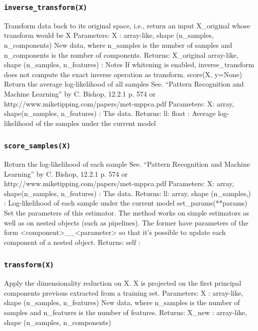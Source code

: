 \begin{frame}[fragile]
\subsubsection*{\texttt{inverse_transform(X)}}
Transform data back to its original space, i.e., return an input X_original whose transform would be X
Parameters:	
X : array-like, shape (n_samples, n_components)
New data, where n_samples is the number of samples and n_components is the number of components.
Returns:	
X_original array-like, shape (n_samples, n_features) :
Notes
If whitening is enabled, inverse_transform does not compute the exact inverse operation as transform.
score(X, y=None)
Return the average log-likelihood of all samples
See. “Pattern Recognition and Machine Learning” by C. Bishop, 12.2.1 p. 574 or http://www.miketipping.com/papers/met-mppca.pdf
Parameters:	
X: array, shape(n_samples, n_features) :
The data.
Returns:	
ll: float :
Average log-likelihood of the samples under the current model
\subsubsection*{\texttt{score_samples(X)}}
Return the log-likelihood of each sample
See. “Pattern Recognition and Machine Learning” by C. Bishop, 12.2.1 p. 574 or http://www.miketipping.com/papers/met-mppca.pdf
Parameters:	
X: array, shape(n_samples, n_features) :
The data.
Returns:	
ll: array, shape (n_samples,) :
Log-likelihood of each sample under the current model
set_params(**params)
Set the parameters of this estimator.
The method works on simple estimators as well as on nested objects (such as pipelines). The former have parameters of the form <component>__<parameter> so that it’s possible to update each component of a nested object.
Returns:	self :
\subsubsection*{\texttt{transform(X)}}
Apply the dimensionality reduction on X.
X is projected on the first principal components previous extracted from a training set.
Parameters:	
X : array-like, shape (n_samples, n_features)
New data, where n_samples is the number of samples and n_features is the number of features.
Returns:	
X_new : array-like, shape (n_samples, n_components)

\newpage


\end{frame}
